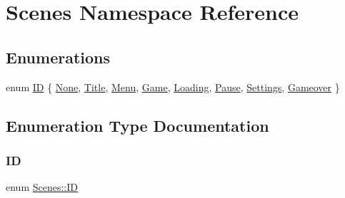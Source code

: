 \hypertarget{namespace_scenes}{}\section{Scenes Namespace Reference}
\label{namespace_scenes}
\subsection*{Enumerations}
\begin{DoxyCompactItemize}
\item 
enum \hyperlink{namespace_scenes_a0ad7ab6856b1d77d498e3a251f6bb275}{ID} \{ \newline
\hyperlink{namespace_scenes_a0ad7ab6856b1d77d498e3a251f6bb275a62ed6cc2cc350c0b2f007bba07e0aac6}{None}, 
\hyperlink{namespace_scenes_a0ad7ab6856b1d77d498e3a251f6bb275a777d5475dda0030fdd34a9f736b5891a}{Title}, 
\hyperlink{namespace_scenes_a0ad7ab6856b1d77d498e3a251f6bb275a8c6d665468f36f79d9f0b1d02ec46b74}{Menu}, 
\hyperlink{namespace_scenes_a0ad7ab6856b1d77d498e3a251f6bb275a1c09bc977521c21c5bd955eca43c24f1}{Game}, 
\newline
\hyperlink{namespace_scenes_a0ad7ab6856b1d77d498e3a251f6bb275aa64f4adb0e245eb77f79e2cf3c2c10e7}{Loading}, 
\hyperlink{namespace_scenes_a0ad7ab6856b1d77d498e3a251f6bb275a554bcf6b884325cfc3097b9d12f3d97b}{Pause}, 
\hyperlink{namespace_scenes_a0ad7ab6856b1d77d498e3a251f6bb275a81c375e87af8f99a546d728ce60e4620}{Settings}, 
\hyperlink{namespace_scenes_a0ad7ab6856b1d77d498e3a251f6bb275aca2e7abcafce28f8ca6e764360a04047}{Gameover}
 \}
\end{DoxyCompactItemize}


\subsection{Enumeration Type Documentation}
\mbox{\label{namespace_scenes_a0ad7ab6856b1d77d498e3a251f6bb275}} 
\subsubsection{\texorpdfstring{ID}{ID}}
{\footnotesize\ttfamily enum \hyperlink{namespace_scenes_a0ad7ab6856b1d77d498e3a251f6bb275}{Scenes\+::\+ID}}

